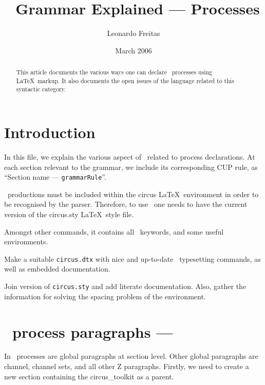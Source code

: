 \documentclass{article}
\begin{document}
\title{\Circus\ Grammar Explained --- Processes}
\author{Leonardo Freitas}
\date{March 2006}

\maketitle

\begin{abstract}
    \noindent This article documents the various ways one can declare \Circus\ processes using \LaTeX\ markup.
    It also documents the open issues of the language related to this syntactic category.
\end{abstract}

\section{Introduction}

In this file, we explain the various aspect of \Circus\ related to
process declarations. At each section relevant to the grammar, we
include its corresponding CUP rule, as ``Section name ---
\texttt{grammarRule}''.

\Circus\ productions must be included within the \textsf{circus}
\LaTeX\ environment in order to be recognised by the parser.
Therefore, to use \Circus\ one needs to have the current version of
the \textsf{circus.sty} \LaTeX\ style file.

Amongst other commands, it contains all \Circus\ keywords, and some
useful environments.

\begin{issue}
   Make a suitable \texttt{circus.dtx} with nice and up-to-date \Circus\
   typesetting commands, as well as embedded documentation.

   Join version of \texttt{circus.sty} and add literate documentation.
   Also, gather the information for solving the spacing problem of the
   \code{circus} environment.
\end{issue}

\section{\Circus\ process paragraphs --- }

In \Circus\ processes are global paragraphs at section level. Other
global paragraphs are channel, channel sets, and all other Z
paragraphs. Firstly, we need to create a new section containing the
\textsf{circus\_toolkit} as a parent.
\end{document}
